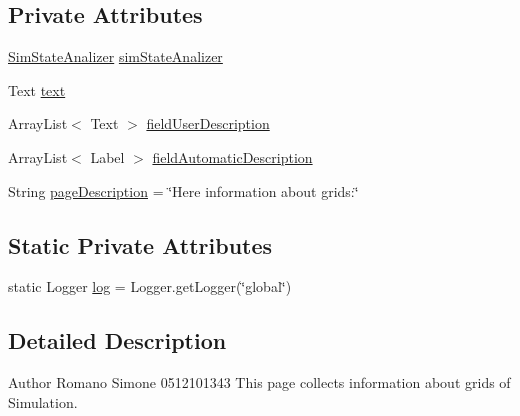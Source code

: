 \subsection*{Private Attributes}
\begin{DoxyCompactItemize}
\item 
\hyperlink{classit_1_1isislab_1_1masonhelperdocumentation_1_1analizer_1_1_sim_state_analizer}{Sim\-State\-Analizer} \hyperlink{classit_1_1isislab_1_1masonhelperdocumentation_1_1mason_1_1wizards_1_1_g___grids_cell_page_aadd93c2041dd8e74fd87a3a432504fa2}{sim\-State\-Analizer}
\item 
Text \hyperlink{classit_1_1isislab_1_1masonhelperdocumentation_1_1mason_1_1wizards_1_1_g___grids_cell_page_aaccd7bc0434484906b1e388bd6b5a1cc}{text}
\item 
Array\-List$<$ Text $>$ \hyperlink{classit_1_1isislab_1_1masonhelperdocumentation_1_1mason_1_1wizards_1_1_g___grids_cell_page_afd78eab95d1f3cb572cb6c344f8b468c}{field\-User\-Description}
\item 
Array\-List$<$ Label $>$ \hyperlink{classit_1_1isislab_1_1masonhelperdocumentation_1_1mason_1_1wizards_1_1_g___grids_cell_page_a7342c260cd8c61cef62d343faa6ddeaa}{field\-Automatic\-Description}
\item 
String \hyperlink{classit_1_1isislab_1_1masonhelperdocumentation_1_1mason_1_1wizards_1_1_g___grids_cell_page_a8c494012928ba98ae13485e1895508d0}{page\-Description} = \char`\"{}Here information about grids\-:\char`\"{}
\end{DoxyCompactItemize}
\subsection*{Static Private Attributes}
\begin{DoxyCompactItemize}
\item 
static Logger \hyperlink{classit_1_1isislab_1_1masonhelperdocumentation_1_1mason_1_1wizards_1_1_g___grids_cell_page_a4d13a56543810c6f8f9907bdd54334d3}{log} = Logger.\-get\-Logger(\char`\"{}global\char`\"{})
\end{DoxyCompactItemize}


\subsection{Detailed Description}
\begin{DoxyAuthor}{Author}
Romano Simone 0512101343 This page collects information about grids of Simulation. 
\end{DoxyAuthor}


